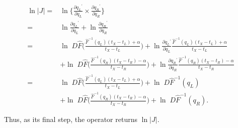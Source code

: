 \documentclass[12pt]{article}
\begin{document}
\begin{align}
	\ln |J| =&  \ln \{ \frac{\partial {q_L}^\prime}{\partial q_L} \times \frac{\partial {q_R}^\prime}{\partial q_R} \} \nonumber \\
			=& \ln  \frac{\partial {q_L}^\prime}{\partial q_L} + \ln \frac{\partial {q_R}^\prime}{\partial q_R}\nonumber \\
			=& \ln \; D \hat{F}\big( \frac{\hat{F}^{-1} (q_L) (t_X - t_L) + \alpha}{t_X - t_L} \big) + \ln \frac{\partial {q_L}^\prime}{\partial q_L}  \frac{\hat{F}^{-1} (q_L) (t_X - t_L) + \alpha}{t_X - t_L} \nonumber\\
			&+ \ln \; D \hat{F}\big( \frac{\hat{F}^{-1} (q_R) (t_X - t_R) - \alpha}{t_X - t_R} \big) + \ln \frac{\partial {q_R}^\prime}{\partial q_R}  \frac{\hat{F}^{-1} (q_R) (t_X - t_R) - \alpha}{t_X - t_R} \nonumber\\
			=& \ln \; D \hat{F}\big( \frac{\hat{F}^{-1} (q_L) (t_X - t_L) + \alpha}{t_X - t_L} \big) + \ln \; D \hat{F}^{-1} (q_L) \nonumber \\
			&+ \ln \; D \hat{F}\big( \frac{\hat{F}^{-1} (q_R) (t_X - t_R) - \alpha}{t_X - t_R} \big) + \ln \; D\hat{F}^{-1} (q_R) .
\end{align}


Thus, as its final step, the operator returns $\ln |J|$.






\end{document}
